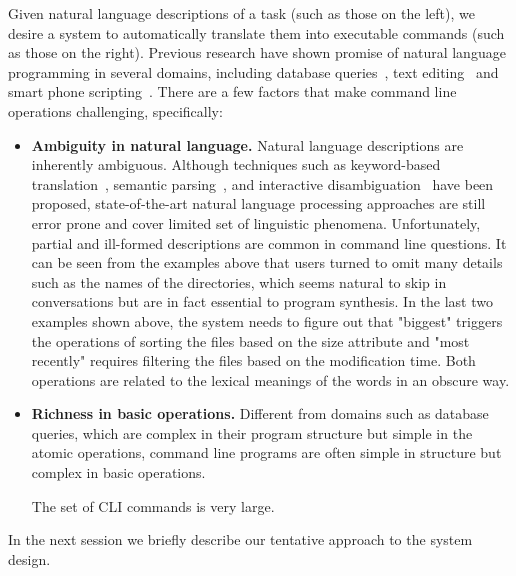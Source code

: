 Given natural language descriptions of a task (such as those on the left), we desire a system to automatically translate them into executable commands (such as those on the right). 
Previous research have shown promise of natural language programming in several domains, including database queries~\cite{DBLP:journals/pvldb/LiJ14, DBLP:conf/sigmod/GulwaniM14}, text editing~\cite{DBLP:journals/corr/DesaiGHJKMRR15} and smart phone scripting~\cite{DBLP:conf/mobisys/LeGS13}. 
There are a few factors that make command line operations challenging, specifically:
\begin{itemize}
\item \textbf{Ambiguity in natural language.} Natural language descriptions are inherently ambiguous. Although techniques such as keyword-based translation~\cite{DBLP:conf/sigmod/GulwaniM14}, semantic parsing~\citep{Zettlemoyer05learningto}, and interactive disambiguation~\cite{DBLP:journals/pvldb/LiJ14} have been proposed, state-of-the-art natural language processing approaches are still error prone and cover limited set of linguistic phenomena.
Unfortunately, partial and ill-formed descriptions are common in command line questions. It can be seen from the examples above that users turned to omit many details such as the names of the directories, which seems natural to skip in conversations but are in fact essential to program synthesis. In the last two examples shown above, the system needs to figure out that "biggest" triggers the operations of sorting the files based on the size attribute and "most recently" requires filtering the files based on the modification time. Both operations are related to the lexical meanings of the words in an obscure way.

\item \textbf{Richness in basic operations.} Different from domains such as database queries, which are complex in their program structure but simple in the atomic operations, command line programs are often simple in structure but complex in basic operations. 

The set of CLI commands is very large.
\end{itemize}

In the next session we briefly describe our tentative approach to the system design.